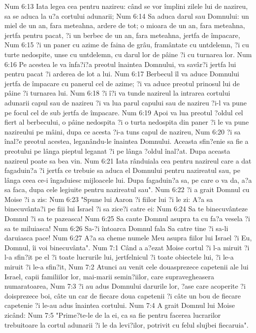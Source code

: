 Num 6:13  Iata legea cea pentru nazireu: când se vor împlini zilele lui de nazireu, sa se aduca la u?a cortului adunarii;
Num 6:14  Sa aduca darul sau Domnului: un miel de un an, fara meteahna, ardere de tot; o mioara de un an, fara meteahna, jertfa pentru pacat, ?i un berbec de un an, fara meteahna, jertfa de împacare,
Num 6:15  ?i un paner cu azime de faina de grâu, framântate cu untdelemn, ?i cu turte nedospite, unse cu untdelemn, cu darul lor de pâine ?i cu turnarea lor.
Num 6:16  Pe acestea le va înfa?i?a preotul înaintea Domnului, va savâr?i jertfa lui pentru pacat ?i arderea de lot a lui.
Num 6:17  Berbecul îl va aduce Domnului jertfa de împacare cu panerul cel de azime; ?i va aduce preotul prinosul lui de pâine ?i turnarea lui.
Num 6:18  ?i î?i va tunde nazireul la intrarea cortului adunarii capul sau de nazireu ?i va lua parul capului sau de nazireu ?i-l va pune pe focul cel de sub jertfa de împacare.
Num 6:19  Apoi va lua preotul ?oldul cel fiert al berbecului, o pâine nedospita ?i o turta nedospita din paner ?i le va pune nazireului pe mâini, dupa ce acesta ?i-a tuns capul de nazireu,
Num 6:20  ?i sa înal?e preotul acestea, leganându-le înaintea Domnului. Aceasta sfin?enie sa fie a preotului pe lânga pieptul leganat ?i pe lânga ?oldul înal?at. Dupa aceasta nazireul poate sa bea vin.
Num 6:21  Iata rânduiala cea pentru nazireul care a dat fagaduin?a ?i jertfa ce trebuie sa aduca el Domnului pentru nazireatul sau, pe lânga ceea ce-i îngaduiesc mijloacele lui. Dupa fagaduin?a sa, pe care o va da, a?a sa faca, dupa cele legiuite pentru nazireatul sau".
Num 6:22  ?i a grait Domnul cu Moise ?i a zis:
Num 6:23  "Spune lui Aaron ?i fiilor lui ?i le zi: A?a sa binecuvânta?i pe fiii lui Israel ?i sa zice?i catre ei:
Num 6:24  Sa te binecuvânteze Domnul ?i sa te pazeasca!
Num 6:25  Sa caute Domnul asupra ta cu fa?a vesela ?i sa te miluiasca!
Num 6:26  Sa-?i întoarca Domnul fala Sa catre tine ?i sa-li daruiasca pace!
Num 6:27  A?a sa cheme numele Meu asupra fiilor lui Israel ?i Eu, Domnul, îi voi binecuvânta".
Num 7:1  Când a a?ezat Moise cortul ?i l-a miruit ?i l-a sfin?it pe el ?i toate lucrurile lui, jertfelnicul ?i toate obiectele lui, ?i le-a miruit ?i le-a sfin?it,
Num 7:2  Atunci au venit cele douasprezece capetenii ale lui Israel, capii familiilor lor, mai-marii semin?iilor, care supravegheasera numaratoarea,
Num 7:3  ?i au adus Domnului darurile lor, ?ase care acoperite ?i doisprezece boi, câte un car de fiecare doua capetenii ?i câte un bou de fiecare capetenie ?i le-au adus înaintea cortului.
Num 7:4  A grait Domnul lui Moise zicând:
Num 7:5  "Prime?te-le de la ei, ca sa fie pentru facerea lucrarilor trebuitoare la cortul adunarii ?i le da levi?ilor, potrivit cu felul slujbei fiecaruia".
